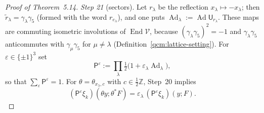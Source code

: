 \documentclass[11pt,letterpaper,reqno]{amsart}
\theoremstyle{definition}
\begin{document}
\begin{proof}[Proof of Theorem~5.14]
\emph{Step 21} (sectors).
Let $r_\lambda$ be the reflection $x_\lambda\mapsto-x_\lambda$; then $\tilde r_\lambda=\gamma_\lambda\gamma_5$ (formed with the word $r_{e_\lambda}$), and one puts $\operatorname{Ad}_\lambda:=\allowbreak \operatorname{Ad}\mathsf U_{r_\lambda}$.
These maps are commuting isometric involutions of $\operatorname{End}\mathcal V$, because $(\gamma_\lambda\gamma_5)^2=-1$ and $\gamma_\lambda\gamma_5$ anticommutes with $\gamma_\mu\gamma_5$ for $\mu\ne\lambda$ (Definition~\ref{qcm:lattice-setting}).
For $\varepsilon\in\{\pm1\}^3$ set
\begin{equation*}
\mathsf P^\varepsilon:=\prod_\lambda\tfrac12\bigl(1+\varepsilon_\lambda\operatorname{Ad}_\lambda\bigr),
\end{equation*}
so that $\sum_\varepsilon\mathsf P^\varepsilon=1$.
For $\theta=\theta_{x_\lambda,c}$ with $c\in\frac12\mathbb Z$, Step~20 implies
\begin{equation*}
(\mathsf P^\varepsilon\xi_k)(\theta y;\theta^*F)=\varepsilon_\lambda\,(\mathsf P^\varepsilon\xi_k)(y;F).
\end{equation*}


\end{proof}
\end{document}
